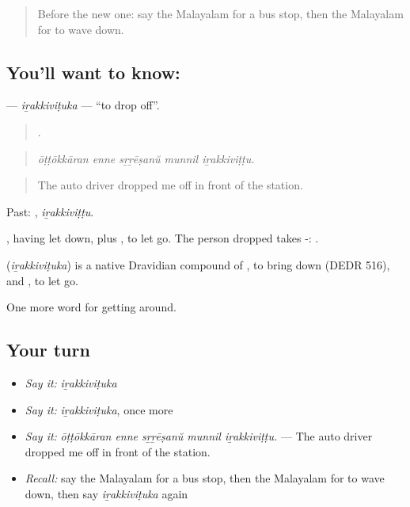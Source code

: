 \label{lesson:ML-C473-irakkivituka}



\begin{quote}
Before the new one: say the Malayalam for a bus stop, then the Malayalam for to wave down.
\end{quote}

\subsection*{You'll want to know: }
\textbf{} — \emph{iṟakkiviṭuka} — \textquotedblleft{}to drop off\textquotedblright{}.

\begin{quote}
    .
\end{quote}

\begin{quote}
\emph{ōṭṭōkkāran enne sṟṟēṣanŭ munnil iṟakkiviṭṭu.}
\end{quote}

\begin{quote}
The auto driver dropped me off in front of the station.
\end{quote}

Past: , \emph{iṟakkiviṭṭu}.

, having let down, plus , to let go. The person dropped takes -: .

\begin{cousinweb}
\textbf{} (\emph{iṟakkiviṭuka}) is a native Dravidian compound of , to bring down (DEDR 516), and , to let go.
\end{cousinweb}

\begin{grammarlens}[title={What you've built}]
One more word for getting around.
\end{grammarlens}

\subsection*{Your turn}
\begin{itemize}
\raggedright
  \item \emph{Say it:} \emph{iṟakkiviṭuka}
  \item \emph{Say it:} \emph{iṟakkiviṭuka}, once more
  \item \emph{Say it:} \emph{ōṭṭōkkāran enne sṟṟēṣanŭ munnil iṟakkiviṭṭu.} — The auto driver dropped me off in front of the station.
  \item \emph{Recall:} say the Malayalam for a bus stop, then the Malayalam for to wave down, then say \emph{iṟakkiviṭuka} again
\end{itemize}

